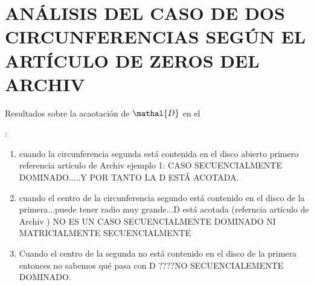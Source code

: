 \documentclass[11pt]{article}
\begin{document}
\noindent 
\section{ ANÁLISIS DEL CASO DE DOS CIRCUNFERENCIAS SEGÚN EL ARTÍCULO DE ZEROS DEL ARCHIV} 

\noindent Resultados sobre la acaotación de $\mathal{D}$ en el 

 : 


\begin{enumerate} 
\item cuando la circunferencia segunda está contenida en el disco abierto primero referencia artículo de Archiv ejemplo 1: 
CASO SECUENCIALMENTE DOMINADO.....Y POR TANTO LA D ESTÁ ACOTADA. 
\item cuando el centro de la circunferencia segundo está contenido en el disco de la primera...puede tener radio muy grande...D está acotada (referncia artículo de Archiv ) NO ES UN CASO SECUENCIALMENTE DOMINADO NI MATRICIALMENTE SECUENCIALMENTE 
\item Cuando el centro de la segunda no está contenido en el disco de la primera entonces no sabemos qué pasa con D ????NO SECUENCIALEMENTE DOMINADO. 
\end{enumerate} 
\end{document}

